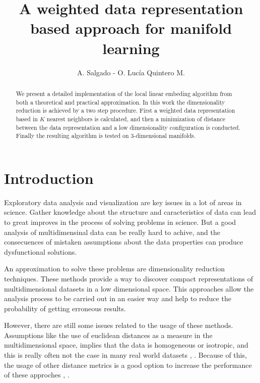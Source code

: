 \documentclass[12pt,journal]{IEEEtran}
\begin{document}
\title{A weighted data representation based approach for manifold learning}
\author{A. Salgado - O. Lucía Quintero M.}
\maketitle

\begin{abstract}
    We present a detailed implementation of the local linear embeding algorithm
    from both a theoretical and practical approximation. In this work the
    dimensionality reduction is achieved by a two step procedure. First a
    weighted data representation based in $K$ nearest neighbors is calculated,
    and then a minimization of distance between the data representation and a
    low dimensionality configuration is conducted. Finally the resulting
    algorithm is tested on 3-dimensional manifolds.
\end{abstract}

\section{Introduction}


Exploratory data analysis and visualization are key issues in a lot of areas
in science. Gather knowledge about the structure and caracteristics of data
can lead to great improves in the process of solving problems in science. But a
good analysis of multidimensinal data can be really hard to achive, and the
consecuences of mistaken assumptions about the data properties can produce
dysfunctional solutions.

\vspace{0.25cm}

An approximation to solve these problems are dimensionality reduction techniques.
These methods provide a way to discover compact representations of
multidimensional datasets in a low dimensional space. This approaches allow the
analysis process to be carried out in an easier way and help to reduce the
probability of getting erroneous results.

\vspace{0.25cm}

However, there are still some issues related to the usage of these methods.
Assumptions like the use of euclidean distances as a measure in the
multidimensional space, implies that the data is homogeneous or isotropic, and
this is really often not the case in many real world datasets
\cite{homogeneous1}, \cite{homogeneous2}. Because of this, the usage of other
distance metrics is a good option to increase the performance of these approches
\cite{dist1}, \cite{dist2}.
\end{document}
